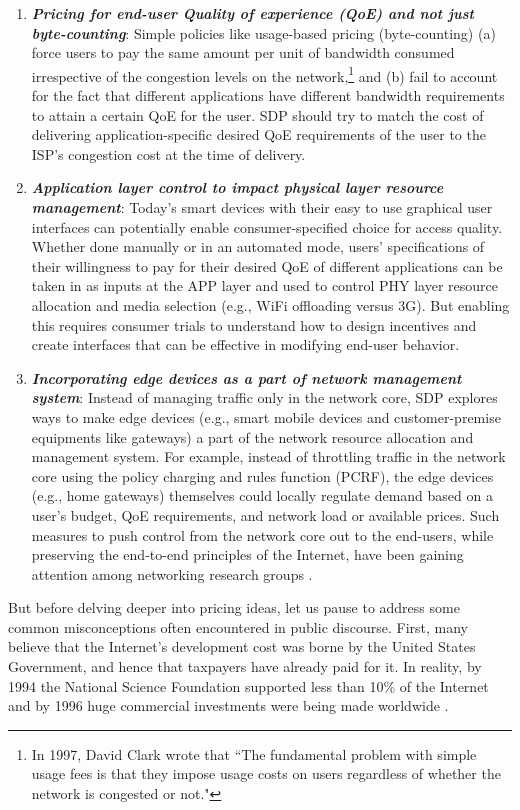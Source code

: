 \begin{enumerate}
\item {\bf \emph{Pricing for end-user Quality of experience (QoE) and not just byte-counting}}: Simple policies like usage-based pricing (byte-counting) (a) force users to pay the same amount per unit of bandwidth consumed irrespective of the congestion levels on the network,\footnote{In 1997, David Clark wrote \cite{DDClark} that ``The fundamental problem with simple usage fees is that they impose usage costs on users regardless of whether the network is congested or not."} and (b) fail to account for the fact that different applications have different bandwidth requirements to attain a certain QoE for the user. SDP should try to match the cost of delivering application-specific desired QoE requirements of the user to the ISP's congestion cost at the time of delivery.     
\item {\bf \emph{Application layer control to impact physical layer resource management}}:  Today's smart devices with their easy to use graphical user interfaces can potentially enable consumer-specified choice for access quality. Whether done manually or in an automated mode, users' specifications of their willingness to pay for their desired QoE of different applications can be taken in as inputs at the APP layer and used to control PHY layer resource allocation and media selection (e.g., WiFi offloading versus 3G). But enabling this requires consumer trials to understand how to design incentives and create interfaces that can be effective in modifying end-user behavior.
\item {\bf \emph{Incorporating edge devices as a part of network management system}}: Instead of managing traffic only in the network core, SDP explores ways to make edge devices (e.g., smart mobile devices and customer-premise equipments like gateways) a part of the network resource allocation and management system. For example, instead of throttling traffic in the network core using the policy charging and rules function (PCRF), the edge devices (e.g., home gateways) themselves could locally regulate demand based on a user's budget, QoE requirements, and network load or available prices. Such measures to push control from the network core out to the end-users, while preserving the end-to-end principles of the Internet, have been gaining attention among networking research groups \cite{M3I}. 
\end{enumerate}

But before delving deeper into pricing ideas, let us pause to address some common misconceptions often encountered in public discourse. First, many believe that the Internet's development cost was borne by the United States Government, and hence that taxpayers have already paid for it. In reality, by 1994 the National Science Foundation supported less than 10\% of the Internet and by 1996 huge commercial investments were being made worldwide \cite{MIT}. 

